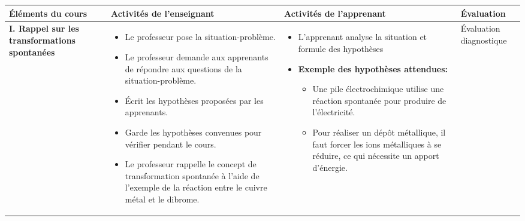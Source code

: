 \documentclass[12pt]{article}
\begin{document}
\begin{tabularx}{\textwidth}{|p{3.5cm}|X|X|p{2.5cm}|}
\hline
\rowcolor{lightgray}
\textbf{Éléments du cours} & \textbf{Activités de l'enseignant} & \textbf{Activités de l'apprenant} & \textbf{Évaluation} \\
\hline
\textbf{I. Rappel sur les transformations spontanées} & 
\begin{itemize}[leftmargin=*]
    \item Le professeur pose la situation-problème.
    \item Le professeur demande aux apprenants de répondre aux questions de la situation-problème.
    \item Écrit les hypothèses proposées par les apprenants.
    \item Garde les hypothèses convenues pour vérifier pendant le cours.
    \item Le professeur rappelle le concept de transformation spontanée à l'aide de l'exemple de la réaction entre le cuivre métal et le dibrome.
\end{itemize} & 
\begin{itemize}[leftmargin=*]
\item L'apprenant analyse la situation et formule des hypothèses
\item   \textbf{Exemple des hypothèses attendues:}
\begin{itemize}
    \item Une pile électrochimique utilise une réaction spontanée pour produire de l'électricité.
    \item Pour réaliser un dépôt métallique, il faut forcer les ions métalliques à se réduire, ce qui nécessite un apport d'énergie.
\end{itemize}

\end{itemize} & 
Évaluation diagnostique \\
\hline


\end{tabularx}
\end{document}
